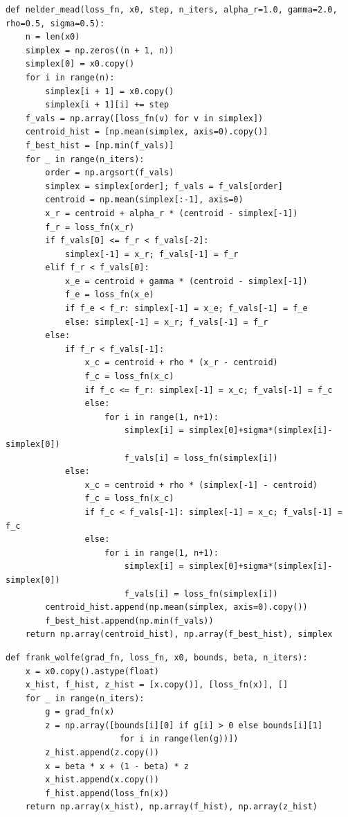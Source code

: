 \documentclass[11pt,a4paper]{article}
\begin{document}
\begin{lstlisting}[caption={Nelder--Mead Simplex}]
def nelder_mead(loss_fn, x0, step, n_iters, alpha_r=1.0, gamma=2.0, rho=0.5, sigma=0.5):
    n = len(x0)
    simplex = np.zeros((n + 1, n))
    simplex[0] = x0.copy()
    for i in range(n):
        simplex[i + 1] = x0.copy()
        simplex[i + 1][i] += step
    f_vals = np.array([loss_fn(v) for v in simplex])
    centroid_hist = [np.mean(simplex, axis=0).copy()]
    f_best_hist = [np.min(f_vals)]
    for _ in range(n_iters):
        order = np.argsort(f_vals)
        simplex = simplex[order]; f_vals = f_vals[order]
        centroid = np.mean(simplex[:-1], axis=0)
        x_r = centroid + alpha_r * (centroid - simplex[-1])
        f_r = loss_fn(x_r)
        if f_vals[0] <= f_r < f_vals[-2]:
            simplex[-1] = x_r; f_vals[-1] = f_r
        elif f_r < f_vals[0]:
            x_e = centroid + gamma * (centroid - simplex[-1])
            f_e = loss_fn(x_e)
            if f_e < f_r: simplex[-1] = x_e; f_vals[-1] = f_e
            else: simplex[-1] = x_r; f_vals[-1] = f_r
        else:
            if f_r < f_vals[-1]:
                x_c = centroid + rho * (x_r - centroid)
                f_c = loss_fn(x_c)
                if f_c <= f_r: simplex[-1] = x_c; f_vals[-1] = f_c
                else:
                    for i in range(1, n+1):
                        simplex[i] = simplex[0]+sigma*(simplex[i]-simplex[0])
                        f_vals[i] = loss_fn(simplex[i])
            else:
                x_c = centroid + rho * (simplex[-1] - centroid)
                f_c = loss_fn(x_c)
                if f_c < f_vals[-1]: simplex[-1] = x_c; f_vals[-1] = f_c
                else:
                    for i in range(1, n+1):
                        simplex[i] = simplex[0]+sigma*(simplex[i]-simplex[0])
                        f_vals[i] = loss_fn(simplex[i])
        centroid_hist.append(np.mean(simplex, axis=0).copy())
        f_best_hist.append(np.min(f_vals))
    return np.array(centroid_hist), np.array(f_best_hist), simplex
\end{lstlisting}

\begin{lstlisting}[caption={Frank--Wolfe Algorithm}]
def frank_wolfe(grad_fn, loss_fn, x0, bounds, beta, n_iters):
    x = x0.copy().astype(float)
    x_hist, f_hist, z_hist = [x.copy()], [loss_fn(x)], []
    for _ in range(n_iters):
        g = grad_fn(x)
        z = np.array([bounds[i][0] if g[i] > 0 else bounds[i][1]
                       for i in range(len(g))])
        z_hist.append(z.copy())
        x = beta * x + (1 - beta) * z
        x_hist.append(x.copy())
        f_hist.append(loss_fn(x))
    return np.array(x_hist), np.array(f_hist), np.array(z_hist)
\end{lstlisting}
\end{document}
